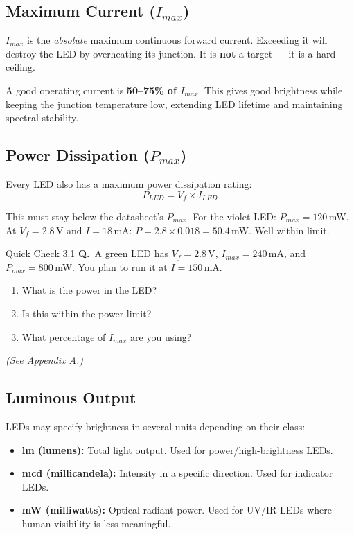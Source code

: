 \documentclass[11pt,letterpaper]{article}
\newcommand{\volt}{\,\si{V}}
\newcommand{\mA}{\,\si{mA}}
\newcommand{\mW}{\,\si{mW}}
\newcommand{\Vf}{V_f}
\newcommand{\Imax}{I_{max}}
\newcommand{\Iled}{I_{LED}}
\newcounter{quiz}
\newcommand{\quizq}{\stepcounter{quiz}\textbf{Q\thequiz.}~}
\begin{document}
\subsection{Maximum Current ($\Imax$)}

$\Imax$ is the \emph{absolute} maximum continuous forward current. Exceeding it will
destroy the LED by overheating its junction. It is \textbf{not} a target --- it is
a hard ceiling.

\begin{tipbox}
A good operating current is \textbf{50--75\% of $\Imax$}. This gives good brightness
while keeping the junction temperature low, extending LED lifetime and maintaining
spectral stability.
\end{tipbox}

\subsection{Power Dissipation ($P_{max}$)}

Every LED also has a maximum power dissipation rating:
\[ P_{LED} = \Vf \times \Iled \]

This must stay below the datasheet's $P_{max}$. For the violet LED: $P_{max} = 120$\mW.
At $\Vf = 2.8$\volt{} and $I = 18$\mA: $P = 2.8 \times 0.018 = 50.4$\mW. Well within limit.

\begin{quizbox}{Quick Check 3.1}
\quizq A green LED has $\Vf = 2.8$\volt, $\Imax = 240$\mA, and $P_{max} = 800$\mW.
You plan to run it at $I = 150$\mA.
\begin{enumerate}[label=(\alph*), leftmargin=2.5em]
  \item What is the power in the LED?
  \item Is this within the power limit?
  \item What percentage of $\Imax$ are you using?
\end{enumerate}
\textit{(See Appendix A.)}
\end{quizbox}

\subsection{Luminous Output}

LEDs may specify brightness in several units depending on their class:
\begin{itemize}[leftmargin=2em]
  \item \textbf{lm (lumens):} Total light output. Used for power/high-brightness LEDs.
  \item \textbf{mcd (millicandela):} Intensity in a specific direction. Used for
    indicator LEDs.
  \item \textbf{mW (milliwatts):} Optical radiant power. Used for UV/IR LEDs where
    human visibility is less meaningful.
\end{itemize}
\end{document}
